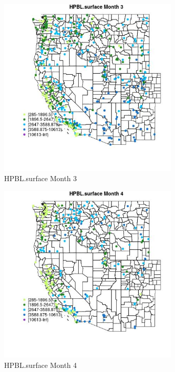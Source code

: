 \begin{figure} 
\centering  
\includegraphics[width=0.77\textwidth]{Code_Outputs/Report_ML_input_PM25_Step4_part_e_de_duplicated_aveswNAs_MapObsMo3HPBLsurface.jpg} 
\caption{\label{fig:Report_ML_input_PM25_Step4_part_e_de_duplicated_aveswNAsMapObsMo3HPBLsurface}HPBL.surface Month 3} 
\end{figure} 
 

\begin{figure} 
\centering  
\includegraphics[width=0.77\textwidth]{Code_Outputs/Report_ML_input_PM25_Step4_part_e_de_duplicated_aveswNAs_MapObsMo4HPBLsurface.jpg} 
\caption{\label{fig:Report_ML_input_PM25_Step4_part_e_de_duplicated_aveswNAsMapObsMo4HPBLsurface}HPBL.surface Month 4} 
\end{figure} 
 

